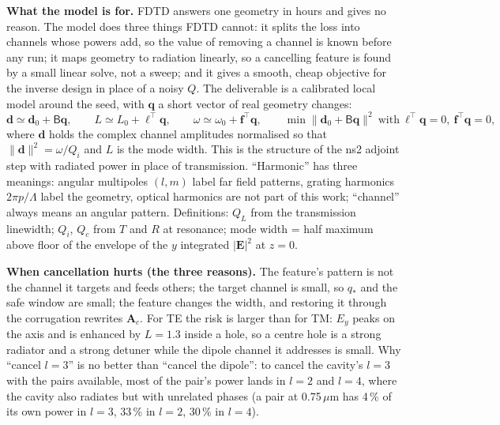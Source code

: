 \documentclass[11pt,a4paper]{article}
\begin{document}
\textbf{What the model is for.} FDTD answers one geometry in hours and gives no reason. The model does three
things FDTD cannot: it splits the loss into channels whose powers add, so the value of removing a channel is
known before any run; it maps geometry to radiation linearly, so a cancelling feature is found by a small linear
solve, not a sweep; and it gives a smooth, cheap objective for the inverse design in place of a noisy $Q$. The
deliverable is a calibrated local model around the seed, with $\mathbf q$ a short vector of real geometry changes:
\[
\mathbf d\simeq\mathbf d_0+\mathsf B\mathbf q,\qquad L\simeq L_0+\boldsymbol\ell^{\!\top}\mathbf q,\qquad
\omega\simeq\omega_0+\mathbf f^{\!\top}\mathbf q,\qquad
\min\|\mathbf d_0+\mathsf B\mathbf q\|^2\ \text{with}\ \boldsymbol\ell^{\!\top}\mathbf q=0,\ \mathbf f^{\!\top}\mathbf q=0,
\]
where $\mathbf d$ holds the complex channel amplitudes normalised so that $\|\mathbf d\|^2=\omega/Q_i$ and $L$ is
the mode width. This is the structure of the ns2 adjoint step with radiated power in place of transmission.
``Harmonic'' has three meanings: angular multipoles $(l,m)$ label far field patterns, grating harmonics
$2\pi p/\Lambda$ label the geometry, optical harmonics are not part of this work; ``channel'' always means an
angular pattern. Definitions: $Q_L$ from the transmission linewidth; $Q_i$, $Q_c$ from $T$ and $R$ at resonance;
mode width = half maximum above floor of the envelope of the $y$ integrated $|\mathbf E|^2$ at $z=0$.

\textbf{When cancellation hurts (the three reasons).} The feature's pattern is not the channel it targets and
feeds others; the target channel is small, so $q_*$ and the safe window are small; the feature changes the
width, and restoring it through the corrugation rewrites $\mathbf A_c$. For TE the risk is larger than for TM:
$E_y$ peaks on the axis and is enhanced by $L=1.3$ inside a hole, so a centre hole is a strong radiator and a
strong detuner while the dipole channel it addresses is small. Why ``cancel $l=3$'' is no better than ``cancel
the dipole'': to cancel the cavity's $l=3$ with the pairs available, most of the pair's power lands in $l=2$ and
$l=4$, where the cavity also radiates but with unrelated phases (a pair at 0.75\,$\mu$m has 4\,\% of its own
power in $l=3$, 33\,\% in $l=2$, 30\,\% in $l=4$).
\end{document}
